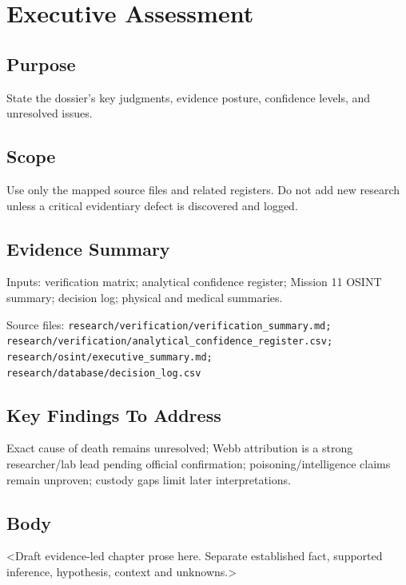 
\chapter{Executive Assessment}
\label{chap:01-executive-assessment}


\section{Purpose}
State the dossier's key judgments, evidence posture, confidence levels, and unresolved issues.

\section{Scope}
Use only the mapped source files and related registers. Do not add new research unless a critical evidentiary defect is discovered and logged.

\section{Evidence Summary}
Inputs: verification matrix; analytical confidence register; Mission 11 OSINT summary; decision log; physical and medical summaries.

Source files: \texttt{research/verification/verification_summary.md; research/verification/analytical_confidence_register.csv; research/osint/executive_summary.md; research/database/decision_log.csv}

\section{Key Findings To Address}
Exact cause of death remains unresolved; Webb attribution is a strong researcher/lab lead pending official confirmation; poisoning/intelligence claims remain unproven; custody gaps limit later interpretations.

\section{Body}
<Draft evidence-led chapter prose here. Separate established fact, supported inference, hypothesis, context and unknowns.>

